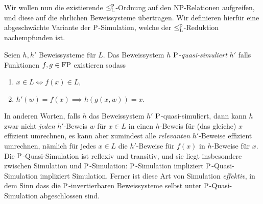 Wir wollen nun die existierende $\leqlp$-Ordnung auf den NP-Relationen aufgreifen, und diese auf die ehrlichen Beweissysteme übertragen. Wir definieren hierfür eine abgeschwächte Variante der $\P$-Simulation, welche der $\leqlp$-Reduktion nachempfunden ist.
\begin{definition}
    Seien $h,h'$ Beweissysteme für $L$. Das Beweissystem $h$ \emph{$\P$-quasi-simuliert} $h'$ falls Funktionen $f,g\in\FP$ existieren sodass
    \begin{enumerate}
        \item $x\in L \iff f(x)\in L$,
        \item $ h'(w)=f(x) \implies h(g(x, w)) = x. $\qedhere
    \end{enumerate}
\end{definition}
In anderen Worten, falls $h$ das Beweissystem $h'$ $\P$-quasi-simuliert, dann kann $h$ zwar nicht \emph{jeden} $h'$-Beweis $w$ für $x\in L$ in einen $h$-Beweis für (das gleiche) $x$ effizient umrechnen, es kann aber zumindest alle \emph{relevanten} $h'$-Beweise effizient umrechnen, nämlich für jedes $x\in L$ die $h'$-Beweise für $f(x)$ in $h$-Beweise für $x$.
Die $\P$-Quasi-Simulation ist reflexiv und transitiv, und sie 
liegt insbesondere zwischen Simulation und $\P$-Simulation: $\P$-Simulation impliziert $\P$-Quasi-Simulation impliziert Simulation.
Ferner ist diese Art von Simulation \emph{effektiv}, in dem Sinn dass die $\P$-invertierbaren Beweissysteme selbst unter $\P$-Quasi-Simulation abgeschlossen sind.

